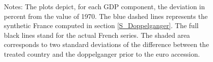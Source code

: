\documentclass[12pt]{article}
\newcommand{\annote}[1]{\parbox{\textwidth}{\renewcommand{\baselinestretch}{1.0}\vspace{12pt} \small Notes: #1}}
\begin{document}
\begin{figure}[h!]
    \annote{The plots depict, for each GDP component, the deviation in percent from the value of 1970. The blue dashed lines represents the synthetic France computed in section \ref{S_Doppelganger}. The full black lines stand for the actual French series. The shaded area corresponds to two standard deviations of the difference between the treated country and the doppelganger prior to the euro accession. }
\end{figure}
\end{document}
